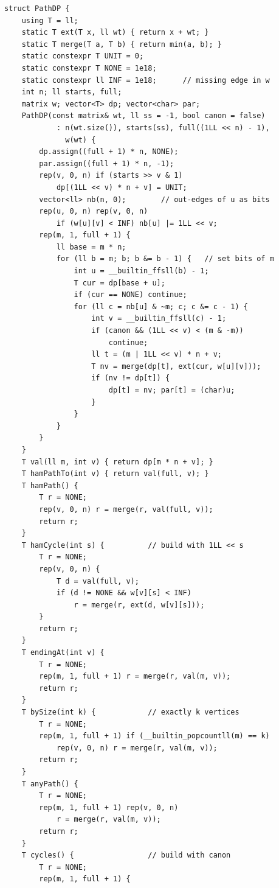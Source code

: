 \begin{lstlisting}
struct PathDP {
    using T = ll;
    static T ext(T x, ll wt) { return x + wt; }
    static T merge(T a, T b) { return min(a, b); }
    static constexpr T UNIT = 0;
    static constexpr T NONE = 1e18;
    static constexpr ll INF = 1e18;      // missing edge in w
    int n; ll starts, full;
    matrix w; vector<T> dp; vector<char> par;
    PathDP(const matrix& wt, ll ss = -1, bool canon = false)
            : n(wt.size()), starts(ss), full((1LL << n) - 1),
              w(wt) {
        dp.assign((full + 1) * n, NONE);
        par.assign((full + 1) * n, -1);
        rep(v, 0, n) if (starts >> v & 1)
            dp[(1LL << v) * n + v] = UNIT;
        vector<ll> nb(n, 0);        // out-edges of u as bits
        rep(u, 0, n) rep(v, 0, n)
            if (w[u][v] < INF) nb[u] |= 1LL << v;
        rep(m, 1, full + 1) {
            ll base = m * n;
            for (ll b = m; b; b &= b - 1) {   // set bits of m
                int u = __builtin_ffsll(b) - 1;
                T cur = dp[base + u];
                if (cur == NONE) continue;
                for (ll c = nb[u] & ~m; c; c &= c - 1) {
                    int v = __builtin_ffsll(c) - 1;
                    if (canon && (1LL << v) < (m & -m))
                        continue;
                    ll t = (m | 1LL << v) * n + v;
                    T nv = merge(dp[t], ext(cur, w[u][v]));
                    if (nv != dp[t]) {
                        dp[t] = nv; par[t] = (char)u;
                    }
                }
            }
        }
    }
    T val(ll m, int v) { return dp[m * n + v]; }
    T hamPathTo(int v) { return val(full, v); }
    T hamPath() {
        T r = NONE;
        rep(v, 0, n) r = merge(r, val(full, v));
        return r;
    }
    T hamCycle(int s) {          // build with 1LL << s
        T r = NONE;
        rep(v, 0, n) {
            T d = val(full, v);
            if (d != NONE && w[v][s] < INF)
                r = merge(r, ext(d, w[v][s]));
        }
        return r;
    }
    T endingAt(int v) {
        T r = NONE;
        rep(m, 1, full + 1) r = merge(r, val(m, v));
        return r;
    }
    T bySize(int k) {            // exactly k vertices
        T r = NONE;
        rep(m, 1, full + 1) if (__builtin_popcountll(m) == k)
            rep(v, 0, n) r = merge(r, val(m, v));
        return r;
    }
    T anyPath() {
        T r = NONE;
        rep(m, 1, full + 1) rep(v, 0, n)
            r = merge(r, val(m, v));
        return r;
    }
    T cycles() {                 // build with canon
        T r = NONE;
        rep(m, 1, full + 1) {

\end{lstlisting}
